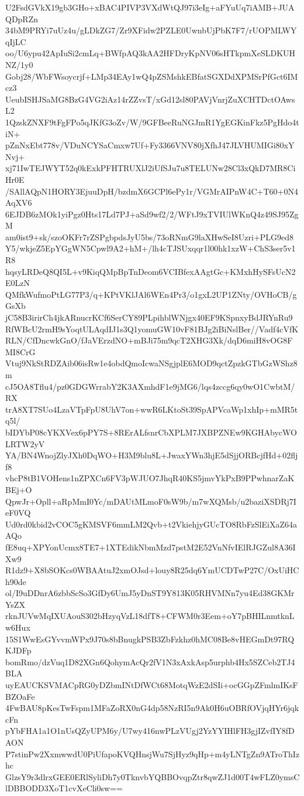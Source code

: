 U2FsdGVkX19gb3GHo+xBAC4PIVP3VXdWtQJ97i3eIg+aFYuUq7iAMB+JUAQDpRZn
34bM9PRYi7uUz4u/gLDkZG7/Zr9XFidw2PZLE0UwnbUjPbK7F7/rUOPMLWYqIjLC
oo/U6ypu42ApIuSi2cmLq+BWfpAQ3kAA2HFDryKpNV06sHTkpmXeSLDKUHNZ/1y0
Gobj28/WbFWsoycrjf+LMp34EAy1wQ4pZSMshkEBfatSGXDdXPMSrPfGct6IMcz3
UeubISHJSaMG8BzG4VG2iAz14rZZvsT/xGd12sl80PAVjVnrjZuXCHTDctOAwsL2
1QzskZNXF9tFgFPo5qJKfG3oZv/W/9GFBeeRuNGJmR1YgEGKinFkz5PgHdo4tiN+
pZnNxEbt778v/VDuNCYSaCmxw7Uf+Fy3366VNV80jXfhJ47JLVHUMIGi80xYNvj+
xj71IwTEJWYT52q0kExkPFHTRUXlJ2iUfSJu7u8TELUNw28Cl3xQkD7MR8CiHr0E
/SAllAQpN1HORY3EjuuDpH/bzdmX6GCPl6ePy1r/VGMrAIPnW4C+T60+0N4AqXV6
6EJDB6zMOk1yiPgz0Hts17Ld7PJ+aSd9wf2/2/WFtJ9xTVIUlWKnQ4z49SJ95ZgM
am0ist9+sk/szoOKFr7rZSPgbpdsJyU5bs/73oRNmG9laXHwSeI8Uzri+PLG9ed8
Y5/wkjeZ5EpYGgWN5Cpwl9A2+hM+/lh4cTJSUxqqr1l00hk1xzW+ChS3ser5v1R8
hqsyLRDeQ8QI5L+v9KiqQMpBpTnDeom6VCIBfexAAgtGc+KMxhHySFsUcN2E0LzN
QMfkWufmoPtLG77P3/q+KPtVKlJAl6WEn4Pr3/o1gxL2UP1ZNty/OVHoCB/gGsXb
jC58B3irirCh4jkARnucrKCf6SerCY89PLpihblWNjgx40EF9KSpnxyBdJRYnRu9
RfWBcU2rmH9sYoqtULAqdIJ1s3Q1yomuGW10vF81BJg2iBiNslBer//Vadf4cVfK
RLN/CfDncwkGnO/fJaVErzdNO+mBJi75m9qcT2XHG3Xk/dqD6miH8vOG8FMI8CrG
Vtuj9NkStRDZAib06isRw1e4obdQmoIcwaNSgjplE6MOD9qctZpzkGTbGzWShz8m
cJ5OA8Tflu4/pz0GDGWrrabY2K3AXmhdF1e9jMG6/lqs4zccg6qy0wO1CwbtM/RX
trA8XT7SUo4LzaVTpFpU8UhV7on+wwR6LKtoSt39SpAPVcaWp1xhIp+mMR5tq5l/
bIDYbP08cYKXVex6pPY7S+8RErALfsnrCbXPLM7JXBPZNEw9KGHAbycWOLRTW2yV
YA/BN4WnojZlyJXh0DqWO+H3M9blu8L+JwaxYWn3hjE5dSjjORBcjfHd+02fljf8
vhcP8tB1VOHens1nZPXCn6FV3pWJUO7JhqR40KS5jmvYkPxB9PPwhnarZaKBEj+O
QpwJr+Opll+aRpMmI0Yc/mDAUtMLmoF0sW9b/m7wXQMsb/u2baziXSDRj7IeF0VQ
Ud0rd0kbid2vCOC5gKMSVF6mmLM2Qvb+t2VkiehjyGUcTO8RbFzSlEiXaZ64aAQo
fE8uq+XPYonUcmx8TE7+1XTEdikNbmMzd7pstM2E52VnNfvIElRJGZul8A36IXw9
R1dz9+X8bSOKcs0WBAAtuJ2xmOJsd+louy8R25dq6YmUCDTwP27C/OxUiHCh90de
ol/I9uDDnrA6zbbScSo3GfDy6UmJ5yDnST9Y813K05RHVMNn7yu4Ed38GKMrYsZX
rknJUVwMqIXUAouS302bHzyqVzL18dfT8+CFWM0r3Eem+oY7pBHILnmtknLw6Hux
15S1WwEsGYvvmWPx9J70s8bBnugkPSB3ZbFzkhz0hMC08Be8vHEGmDt97RQKJDFp
bomRmo/dzVuq1D82XGn6QohymAcQr2fV1N3xAxkAsp5urphb4Hx5SZCeb2TJ4BLA
uyEAUCKSVMACpRG0yDZbmINtDfWCt68MotqWzE2dSIi+ocGGpZFmlmIKsFBZOaFe
4FwBAU8pKesTwFspm1MFaZoRX0nG4dp58NzRI5n9Ak0H6uOBRfOVjqHYr6jqkcFn
pYbFHA1a1O1nUsQZyUPM6y/U7wy416nwPLzVUgj2YzYYIHlFH3gjIZvfIY8fDAON
P7stinPw2XxmwwdU0PiUfapoKVQHnsjWu7SjHyz9qHp+m4yLNTgZn9ATroThIzhc
GlzsY9r3dlrxGEE0ERlSyliDh7y0TknvbYQBBOvqpZtr8qwZJ1d00T4wFLZ0ymsC
lDBBODD3XoT1cvXeCli0sw==
